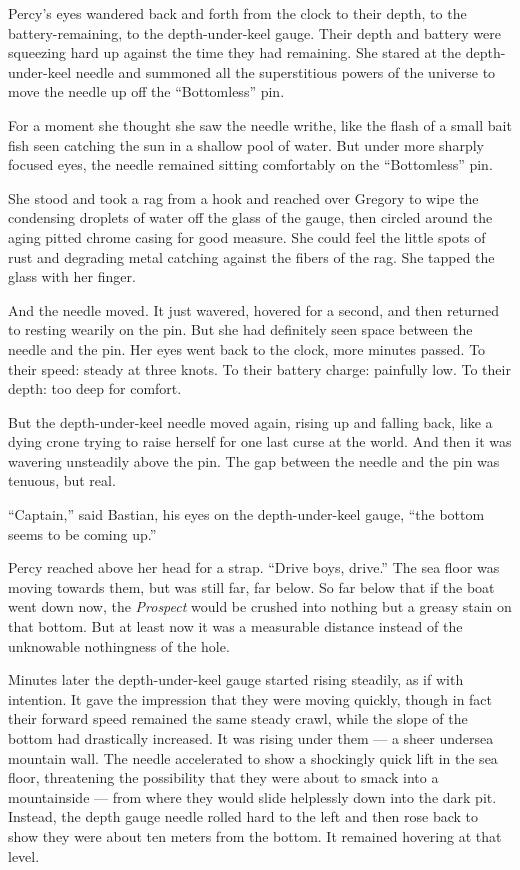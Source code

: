 \documentclass[
]{scrbook}
\begin{document}
Percy's eyes wandered back and forth from the clock to their depth, to
the battery-remaining, to the depth-under-keel gauge. Their depth and
battery were squeezing hard up against the time they had remaining. She
stared at the depth-under-keel needle and summoned all the superstitious
powers of the universe to move the needle up off the ``Bottomless'' pin.

For a moment she thought she saw the needle writhe, like the flash of a
small bait fish seen catching the sun in a shallow pool of water. But
under more sharply focused eyes, the needle remained sitting comfortably
on the ``Bottomless'' pin.

She stood and took a rag from a hook and reached over Gregory to wipe
the condensing droplets of water off the glass of the gauge, then
circled around the aging pitted chrome casing for good measure. She
could feel the little spots of rust and degrading metal catching against
the fibers of the rag. She tapped the glass with her finger.

And the needle moved. It just wavered, hovered for a second, and then
returned to resting wearily on the pin. But she had definitely seen
space between the needle and the pin. Her eyes went back to the clock,
more minutes passed. To their speed: steady at three knots. To their
battery charge: painfully low. To their depth: too deep for comfort.

But the depth-under-keel needle moved again, rising up and falling back,
like a dying crone trying to raise herself for one last curse at the
world. And then it was wavering unsteadily above the pin. The gap
between the needle and the pin was tenuous, but real.

``Captain,'' said Bastian, his eyes on the depth-under-keel gauge, ``the
bottom seems to be coming up.''

Percy reached above her head for a strap. ``Drive boys, drive.'' The sea
floor was moving towards them, but was still far, far below. So far
below that if the boat went down now, the \emph{Prospect} would be
crushed into nothing but a greasy stain on that bottom. But at least now
it was a measurable distance instead of the unknowable nothingness of
the hole.

Minutes later the depth-under-keel gauge started rising steadily, as if
with intention. It gave the impression that they were moving quickly,
though in fact their forward speed remained the same steady crawl, while
the slope of the bottom had drastically increased. It was rising under
them --- a sheer undersea mountain wall. The needle accelerated to show
a shockingly quick lift in the sea floor, threatening the possibility
that they were about to smack into a mountainside --- from where they
would slide helplessly down into the dark pit. Instead, the depth gauge
needle rolled hard to the left and then rose back to show they were
about ten meters from the bottom. It remained hovering at that level.
\end{document}
